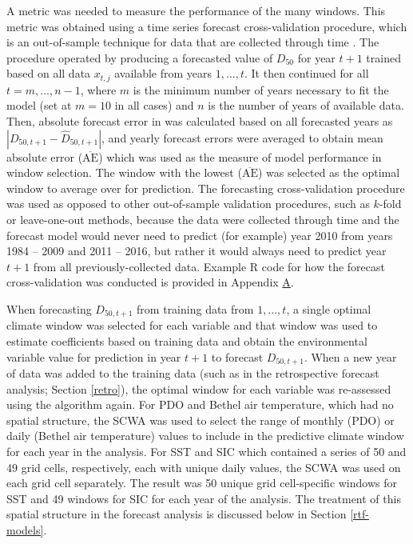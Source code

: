 \documentclass[12pt,]{book}
\theoremstyle{definition}
\theoremstyle{definition}
\theoremstyle{definition}
\theoremstyle{remark}
\begin{document}
A metric was needed to measure the performance of the many windows. This
metric was obtained using a time series forecast cross-validation
procedure, which is an out-of-sample technique for data that are
collected through time \citep{arlot-celisse-2010}. The procedure
operated by producing a forecasted value of \(D_{50}\) for year \(t+1\)
trained based on all data \(x_{t,j}\) available from years
\(1, ..., t\). It then continued for all \(t = m, ..., n-1\), where
\(m\) is the minimum number of years necessary to fit the model (set at
\(m = 10\) in all cases) and \(n\) is the number of years of available
data. Then, absolute forecast error in was calculated based on all
forecasted years as \(|D_{50,t+1} - \hat{D}_{50,t+1}|\), and yearly
forecast errors were averaged to obtain mean absolute error
(\(\overline{\text{AE}}\)) which was used as the measure of model
performance in window selection. The window with the lowest
(\(\overline{\text{AE}}\)) was selected as the optimal window to average
over for prediction. The forecasting cross-validation procedure was used
as opposed to other out-of-sample validation procedures, such as
\(k\)-fold or leave-one-out methods, because the data were collected
through time and the forecast model would never need to predict (for
example) year 2010 from years 1984 -- 2009 and 2011 -- 2016, but rather
it would always need to predict year \(t+1\) from all
previously-collected data. Example R code for how the forecast
cross-validation was conducted is provided in Appendix
\protect\hyperlink{appendix-a}{A}.

When forecasting \(D_{50,t+1}\) from training data from \(1,...,t\), a
single optimal climate window was selected for each variable and that
window was used to estimate coefficients based on training data and
obtain the environmental variable value for prediction in year \(t+1\)
to forecast \(D_{50,t+1}\). When a new year of data was added to the
training data (such as in the retrospective forecast analysis; Section
\ref{retro}), the optimal window for each variable was re-assessed using
the algorithm again. For PDO and Bethel air temperature, which had no
spatial structure, the SCWA was used to select the range of monthly
(PDO) or daily (Bethel air temperature) values to include in the
predictive climate window for each year in the analysis. For SST and SIC
which contained a series of 50 and 49 grid cells, respectively, each
with unique daily values, the SCWA was used on each grid cell
separately. The result was 50 unique grid cell-specific windows for SST
and 49 windows for SIC for each year of the analysis. The treatment of
this spatial structure in the forecast analysis is discussed below in
Section \ref{rtf-models}.
\end{document}
